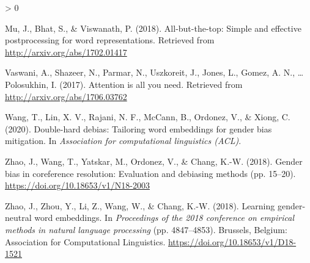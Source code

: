 \documentclass[
  english,
  man,floatsintext]{apa6}
\newlength{\cslhangindent}
\newenvironment{CSLReferences}[2] %
 {%
  \setlength{\parindent}{0pt}
  \ifodd #1 \everypar{\setlength{\hangindent}{\cslhangindent}}\ignorespaces\fi
  \ifnum #2 > 0
  \setlength{\parskip}{#2\baselineskip}
  \fi
 }%
 {}
\begin{document}
\begin{CSLReferences}{1}{0}
\leavevmode\hypertarget{ref-mu_2018}{}%
Mu, J., Bhat, S., \& Viswanath, P. (2018). All-but-the-top: Simple and effective postprocessing for word representations. Retrieved from \url{http://arxiv.org/abs/1702.01417}

\leavevmode\hypertarget{ref-vaswani_2017}{}%
Vaswani, A., Shazeer, N., Parmar, N., Uszkoreit, J., Jones, L., Gomez, A. N., \ldots{} Polosukhin, I. (2017). Attention is all you need. Retrieved from \url{http://arxiv.org/abs/1706.03762}

\leavevmode\hypertarget{ref-wang_2020}{}%
Wang, T., Lin, X. V., Rajani, N. F., McCann, B., Ordonez, V., \& Xiong, C. (2020). Double-hard debias: Tailoring word embeddings for gender bias mitigation. In \emph{Association for computational linguistics (ACL)}.

\leavevmode\hypertarget{ref-zhao_2018a}{}%
Zhao, J., Wang, T., Yatskar, M., Ordonez, V., \& Chang, K.-W. (2018). Gender bias in coreference resolution: Evaluation and debiasing methods (pp. 15--20). \url{https://doi.org/10.18653/v1/N18-2003}

\leavevmode\hypertarget{ref-zhao_2018b}{}%
Zhao, J., Zhou, Y., Li, Z., Wang, W., \& Chang, K.-W. (2018). Learning gender-neutral word embeddings. In \emph{Proceedings of the 2018 conference on empirical methods in natural language processing} (pp. 4847--4853). Brussels, Belgium: Association for Computational Linguistics. \url{https://doi.org/10.18653/v1/D18-1521}

\end{CSLReferences}

\endgroup
\end{document}

